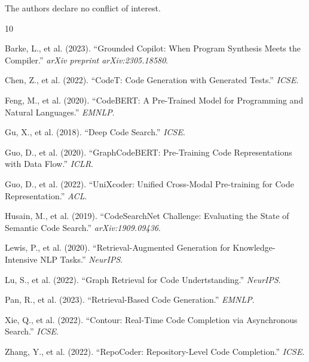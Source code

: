 \documentclass[10pt,twocolumn]{article}
\begin{document}
The authors declare no conflict of interest.


\begin{thebibliography}{10}

Barke, L., et al. (2023). ``Grounded Copilot: When Program Synthesis Meets the Compiler.'' \textit{arXiv preprint arXiv:2305.18580}.

Chen, Z., et al. (2022). ``CodeT: Code Generation with Generated Tests.'' \textit{ICSE}.

Feng, M., et al. (2020). ``CodeBERT: A Pre-Trained Model for Programming and Natural Languages.'' \textit{EMNLP}.

Gu, X., et al. (2018). ``Deep Code Search.'' \textit{ICSE}.

Guo, D., et al. (2020). ``GraphCodeBERT: Pre-Training Code Representations with Data Flow.'' \textit{ICLR}.

Guo, D., et al. (2022). ``UniXcoder: Unified Cross-Modal Pre-training for Code Representation.'' \textit{ACL}.

Husain, M., et al. (2019). ``CodeSearchNet Challenge: Evaluating the State of Semantic Code Search.'' \textit{arXiv:1909.09436}.

Lewis, P., et al. (2020). ``Retrieval-Augmented Generation for Knowledge-Intensive NLP Tasks.'' \textit{NeurIPS}.

Lu, S., et al. (2022). ``Graph Retrieval for Code Undertstanding.'' \textit{NeurIPS}.

Pan, R., et al. (2023). ``Retrieval-Based Code Generation.'' \textit{EMNLP}.

Xie, Q., et al. (2022). ``Contour: Real-Time Code Completion via Asynchronous Search.'' \textit{ICSE}.

Zhang, Y., et al. (2022). ``RepoCoder: Repository-Level Code Completion.'' \textit{ICSE}.

\end{thebibliography}
\end{document}

